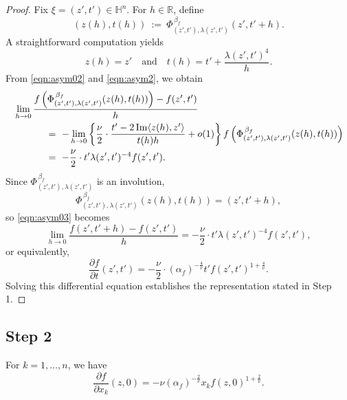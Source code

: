 \documentclass[reqno]{amsart}
\theoremstyle{definition}
\theoremstyle{remark}
\numberwithin{equation}{section}
\begin{document}
\begin{proof}
Fix $\xi = (z', t') \in \mathbb{H}^n$. For $h \in \mathbb{R}$, define
\[
(z(h), t(h)) ~:=~ \Phi_{(z',t'),\lambda(z',t')}^{\, \beta_f} (z', t' + h).
\]
A straightforward computation yields
\[
z(h) = z' \quad \text{and} \quad t(h) = t' + \frac{\lambda(z',t')^4}{h}.
\]
From \eqref{eqn:asym02} and \eqref{eqn:asym2}, we obtain
\begin{align}
& \lim_{h \to 0} \frac{f\left(\Phi_{(z', t'), \lambda(z',t')}^{\, \beta_f} (z(h),t(h))\right) 
- f(z',t')}{h} \notag\\
& \qquad \quad ~=~ -\lim_{h \to 0} \left\{ \frac{\nu}{2} \cdot \frac{t' - 2 \operatorname{Im} \langle z(h), z'\rangle}{t(h) h} + o(1) \right\} 
f\left(\Phi_{(z',t'),\lambda(z',t')}^{\, \beta_f} (z(h),t(h))\right) \notag\\
& \qquad \quad ~=~ -\frac{\nu}{2} \cdot t' \lambda(z',t')^{-4} f(z',t'). \label{eqn:asym03}
\end{align}
Since $\Phi_{(z',t'),\lambda(z',t')}^{\, \beta_f}$ is an involution,
\[
\Phi_{(z',t'),\lambda(z',t')}^{\, \beta_f} \left(z(h), t(h)\right) = (z', t' + h),
\]
so \eqref{eqn:asym03} becomes
\[
\lim_{h \to 0} \frac{f(z', t' + h) - f(z', t')}{h} 
= -\frac{\nu}{2} \cdot t' \lambda(z',t')^{-4} f(z', t'),
\]
or equivalently,
\[
\frac{\partial f}{\partial t}(z', t')
= -\frac{\nu}{2} \cdot (\alpha_f)^{-\frac{4}{\nu}} t' f(z', t')^{1 + \frac{4}{\nu}}.
\]
Solving this differential equation establishes the representation stated in Step 1.
\end{proof}





\subsection*{Step 2}
For \( k = 1, \dots, n \), we have
\begin{equation}\label{eqn:partialx}
\frac{\partial f}{\partial x_k}(z,0) = -\nu (\alpha_f)^{-\frac{2}{\nu}} x_k f(z,0)^{1+\frac{2}{\nu}} .
\end{equation}
\end{document}
